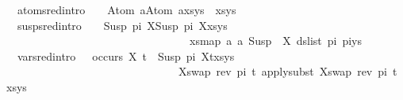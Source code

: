 \begin{isabellebody}
\ \ atom{\isacharunderscore}{\kern0pt}sred{\isacharbrackleft}{\kern0pt}intro{\isacharbang}{\kern0pt}{\isacharbrackright}{\kern0pt}{\isacharcolon}{\kern0pt}\ \ \ \ {\isachardoublequoteopen}{\isacharparenleft}{\kern0pt}{\isacharparenleft}{\kern0pt}Atom\ a{\isasymapprox}{\isacharquery}{\kern0pt}Atom\ a{\isacharparenright}{\kern0pt}{\isacharhash}{\kern0pt}xs{\isacharcomma}{\kern0pt}ys{\isacharparenright}{\kern0pt}\ {\isasymturnstile}{\isacharbrackleft}{\kern0pt}{\isacharbrackright}{\kern0pt}{\isasymleadsto}\ {\isacharparenleft}{\kern0pt}xs{\isacharcomma}{\kern0pt}ys{\isacharparenright}{\kern0pt}{\isachardoublequoteclose}\ {\isacharbar}{\kern0pt}\isanewline
\ \ susp{\isacharunderscore}{\kern0pt}sred{\isacharbrackleft}{\kern0pt}intro{\isacharbang}{\kern0pt}{\isacharbrackright}{\kern0pt}{\isacharcolon}{\kern0pt}\ \ \ \ {\isachardoublequoteopen}{\isacharparenleft}{\kern0pt}{\isacharparenleft}{\kern0pt}Susp\ pi{}\ X{\isasymapprox}{\isacharquery}{\kern0pt}Susp\ pi{}\ X{\isacharparenright}{\kern0pt}{\isacharhash}{\kern0pt}xs{\isacharcomma}{\kern0pt}ys{\isacharparenright}{\kern0pt}\ \isanewline
\ \ \ \ \ \ \ \ \ \ \ \ \ \ \ \ \ \ \ \ \ \ \ \ \ \ \ \ \ \ \ \ {\isasymturnstile}{\isacharbrackleft}{\kern0pt}{\isacharbrackright}{\kern0pt}{\isasymleadsto}\ {\isacharparenleft}{\kern0pt}xs{\isacharcomma}{\kern0pt}{\isacharparenleft}{\kern0pt}map\ {\isacharparenleft}{\kern0pt}{\isasymlambda}a{\isachardot}{\kern0pt}\ a{\isasymsharp}{\isacharquery}{\kern0pt}\ Susp\ {\isacharbrackleft}{\kern0pt}{\isacharbrackright}{\kern0pt}\ X{\isacharparenright}{\kern0pt}\ {\isacharparenleft}{\kern0pt}ds{\isacharunderscore}{\kern0pt}list\ pi{}\ pi{}{\isacharparenright}{\kern0pt}{\isacharparenright}{\kern0pt}{\isacharat}{\kern0pt}ys{\isacharparenright}{\kern0pt}{\isachardoublequoteclose}\ {\isacharbar}{\kern0pt}\ \isanewline
\ \ var{\isacharunderscore}{\kern0pt}{}{\isacharunderscore}{\kern0pt}sred{\isacharbrackleft}{\kern0pt}intro{\isacharbang}{\kern0pt}{\isacharbrackright}{\kern0pt}{\isacharcolon}{\kern0pt}\ \ \ {\isachardoublequoteopen}{\isasymnot}{\isacharparenleft}{\kern0pt}occurs\ X\ t{\isacharparenright}{\kern0pt}\ {\isasymLongrightarrow}\ {\isacharparenleft}{\kern0pt}{\isacharparenleft}{\kern0pt}Susp\ pi\ X{\isasymapprox}{\isacharquery}{\kern0pt}t{\isacharparenright}{\kern0pt}{\isacharhash}{\kern0pt}xs{\isacharcomma}{\kern0pt}ys{\isacharparenright}{\kern0pt}\ \isanewline
\ \ \ \ \ \ \ \ \ \ \ \ \ \ \ \ \ \ \ \ \ \ \ \ \ \ \ \ \ \ \ {\isasymturnstile}{\isacharbrackleft}{\kern0pt}{\isacharparenleft}{\kern0pt}X{\isacharcomma}{\kern0pt}swap\ {\isacharparenleft}{\kern0pt}rev\ pi{\isacharparenright}{\kern0pt}\ t{\isacharparenright}{\kern0pt}{\isacharbrackright}{\kern0pt}{\isasymleadsto}\ apply{\isacharunderscore}{\kern0pt}subst\ {\isacharbrackleft}{\kern0pt}{\isacharparenleft}{\kern0pt}X{\isacharcomma}{\kern0pt}swap\ {\isacharparenleft}{\kern0pt}rev\ pi{\isacharparenright}{\kern0pt}\ t{\isacharparenright}{\kern0pt}{\isacharbrackright}{\kern0pt}\ {\isacharparenleft}{\kern0pt}xs{\isacharcomma}{\kern0pt}ys{\isacharparenright}{\kern0pt}{\isachardoublequoteclose}\ {\isacharbar}{\kern0pt}\isanewline

\end{isabellebody}
